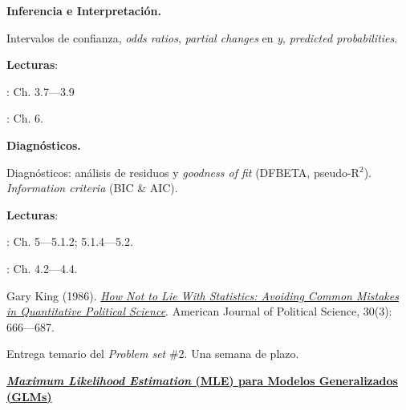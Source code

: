 \documentclass[letterpaper]{article}
\renewenvironment{itemize}{
  \begin{list}{}{
    \setlength{\leftmargin}{1.5em}
  }
}{
  \end{list}
}
\begin{document}
\begin{enumerate}[label=\roman*.]
        \begin{itemize} 
        \item[13.] {\bf Inferencia e Interpretaci\'on.}
        \begin{itemize} 
          \item[$\circ$] Intervalos de confianza, \emph{odds ratios}, \emph{partial changes} en \emph{y}, \emph{predicted probabilities}.
          \item[$\circ$] {\bf Lecturas}: 
            \begin{itemize} 
              \item[$\diamond$] \textcite{Long2001}: Ch. 3.7---3.9
              \item[$\diamond$] \textcite{Ward2018}: Ch. 6.
            \end{itemize}
        \end{itemize}
      \end{itemize}


       \begin{itemize} 
        \item[14.] {\bf Diagn\'osticos.}
        \begin{itemize} 
          \item[$\circ$] Diagn\'osticos: an\'alisis de residuos y \emph{goodness of fit} (DFBETA, pseudo-R$^{2}$). \emph{Information criteria} (BIC \& AIC).
          \item[$\circ$] {\bf Lecturas}: 
            \begin{itemize} 
              \item[$\diamond$] \textcite{Ward2018}: Ch. 5---5.1.2; 5.1.4---5.2.
              \item[$\diamond$] \textcite{Long2001}: Ch. 4.2---4.4.
              \item[$\diamond$] Gary King (1986). \href{https://github.com/hbahamonde/MLE/raw/master/Readings/King_lie.pdf}{\emph{How Not to Lie With Statistics: Avoiding Common Mistakes in Quantitative Political Science}}. American Journal of Political Science, 30(3): 666---687.
            \end{itemize}
        \end{itemize}
      \end{itemize}
			

\item[{\color{red}\Pointinghand}] Entrega temario del \emph{Problem set} \#2. Una semana de plazo.


\item {\bf{\color{ForestGreen}\underline{\emph{Maximum Likelihood Estimation} (MLE) para Modelos Generalizados (GLMs)}}}


\end{enumerate}
\end{document}
